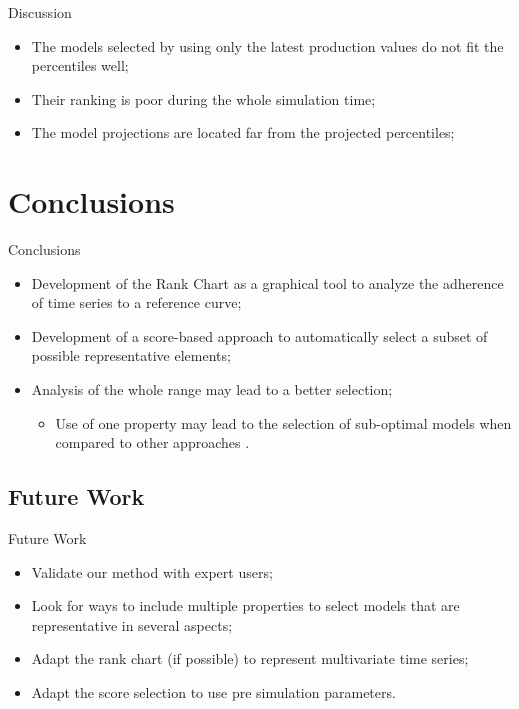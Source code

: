 \documentclass{beamer}
\begin{document}
\begin{frame}{Discussion}
  \begin{itemize}
    \item The models selected by using only the latest production values do not fit the percentiles well;
    \item Their ranking is poor during the whole simulation time;
    \item The model projections are located far from the projected percentiles;
  \end{itemize}
\end{frame}

\section{Conclusions}
\begin{frame}
  \tableofcontents[currentsection]
\end{frame}

\begin{frame}{Conclusions}
  \begin{itemize}
    \item Development of the Rank Chart as a graphical tool to analyze the adherence of time series to a reference curve;
    \item Development of a score-based approach to automatically select a subset of possible representative elements;
    \item Analysis of the whole range may lead to a better selection;
    \begin{itemize}
      \item Use of one property may lead to the selection of sub-optimal models when compared to other approaches  .
    \end{itemize}
  \end{itemize}
\end{frame}

\subsection{Future Work}
\begin{frame}{Future Work}
  \begin{itemize}
    \item Validate our method with expert users;
    \item Look for ways to include multiple properties to select models that are representative in several aspects;
    \item Adapt the rank chart (if possible) to represent multivariate time series;
    \item Adapt the score selection to use pre simulation parameters.
  \end{itemize}
\end{frame}

\section{}
\begin{frame}
  \titlepage
\end{frame}
\end{document}
